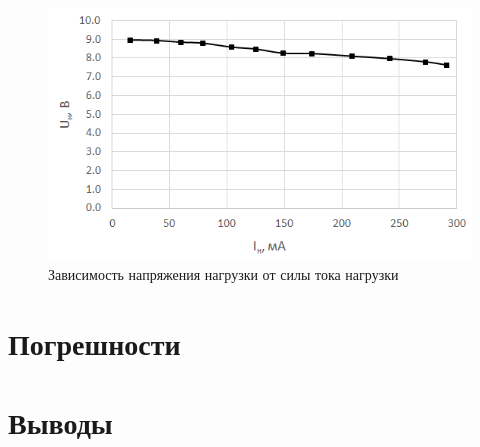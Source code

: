 \begin{figure}[H]
	\begin{center}
		\includegraphics[width=14cm]{img/5}
		\caption{Зависимость напряжения нагрузки от силы тока нагрузки}
		\label{g:3} %
	\end{center}
\end{figure}

\section{Погрешности}

  
\section{Выводы}



